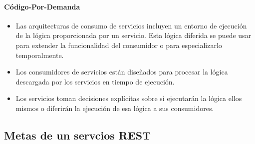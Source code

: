   \paragraph{Código-Por-Demanda}
 
	\begin{itemize}
		\item  Las arquitecturas de consumo de servicios incluyen un entorno de ejecución de la lógica proporcionada por un servicio. Esta lógica diferida se puede usar para extender la funcionalidad del consumidor o para especializarlo temporalmente.
		\item Los consumidores de servicios están diseñados para procesar la lógica descargada por los servicios en tiempo de ejecución.
		
		\item Los servicios toman decisiones explícitas sobre si ejecutarán la lógica ellos mismos o diferirán la ejecución de esa lógica a sus consumidores.		
		
	\end{itemize}
	
		\subsection{Metas de un servcios REST}
		       
